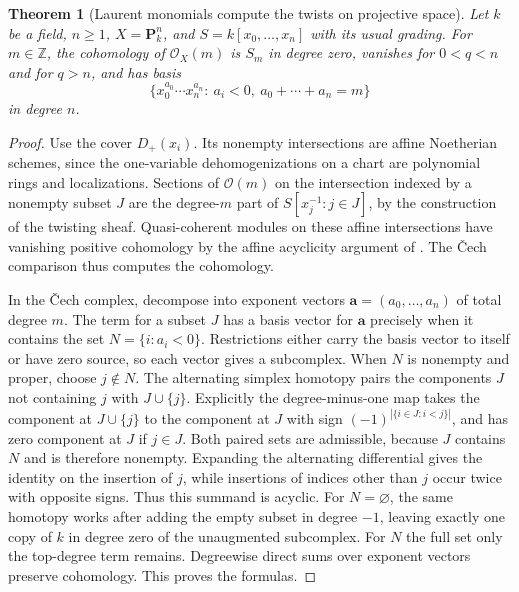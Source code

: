 \documentclass[11pt,oneside,openany]{book}
\newtheorem{theorem}{Theorem}[chapter]
\theoremstyle{definition}
\theoremstyle{remark}
\begin{document}
\begin{theorem}[Laurent monomials compute the twists on projective space]\label{res:U21}
Let \(k\) be a field, \(n\geq1\), \(X=\mathbf P^n_k\),
and \(S=k[x_0,\ldots,x_n]\) with its usual grading.
For \(m\in\mathbb Z\), the cohomology of \(\mathcal O_X(m)\)
is \(S_m\) in degree zero, vanishes for \(0<q<n\)
and for \(q>n\), and has basis
\[
   \{x_0^{a_0}\cdots x_n^{a_n}:\ a_i<0,\
           a_0+\cdots+a_n=m\}
\]
in degree \(n\).
\end{theorem}
\begin{proof}
Use the cover \(D_+(x_i)\). Its nonempty intersections
are affine Noetherian schemes, since the one-variable
dehomogenizations on a chart are polynomial rings and
localizations. Sections of \(\mathcal O(m)\) on the
intersection indexed by a nonempty subset \(J\) are the
degree-\(m\) part of \(S[x_j^{-1}:j\in J]\), by the
construction of the twisting sheaf. Quasi-coherent
modules on these affine intersections have vanishing
positive cohomology by the affine acyclicity argument of
\cite[L10]{ca-topics}. The \v{C}ech comparison
\cite[H02--H04]{ha-core} thus computes the cohomology.

In the \v{C}ech complex, decompose into exponent vectors
\(\mathbf a=(a_0,\ldots,a_n)\) of total degree \(m\).
The term for a subset \(J\) has a basis vector for
\(\mathbf a\) precisely when it contains the set
\(N=\{i:a_i<0\}\). Restrictions either carry the basis
vector to itself or have zero source, so each vector
gives a subcomplex. When \(N\) is nonempty and proper,
choose \(j\notin N\). The alternating simplex homotopy
pairs the components \(J\) not containing \(j\) with
\(J\cup\{j\}\). Explicitly the degree-minus-one map
takes the component at \(J\cup\{j\}\) to the component
at \(J\) with sign \((-1)^{|\{i\in J:i<j\}|}\), and has
zero component at \(J\) if \(j\in J\).
Both paired sets are admissible, because \(J\) contains
\(N\) and is therefore nonempty. Expanding the
alternating differential gives the identity on the
insertion of \(j\), while insertions of indices other
than \(j\) occur twice with opposite signs. Thus this
summand is acyclic. For \(N=\varnothing\), the same
homotopy works after adding the empty subset in
degree \(-1\), leaving exactly one copy of \(k\) in
degree zero of the unaugmented subcomplex.
For \(N\) the full set only the top-degree term remains.
Degreewise direct sums over exponent vectors preserve
cohomology. This proves the formulas.
\end{proof}
\end{document}
